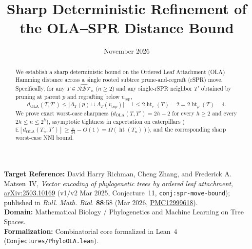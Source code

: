 \documentclass[11pt]{article}
\title{Sharp Deterministic Refinement of the OLA--SPR Distance Bound}
\author{}
\date{November 2026}
\theoremstyle{definition}
\theoremstyle{remark}
\DeclareMathOperator{\htr}{ht}
\begin{document}
\maketitle

\begin{center}
\small
\textbf{Target Reference:} David Harry Richman, Cheng Zhang, and Frederick A. Matsen~IV,
\emph{Vector encoding of phylogenetic trees by ordered leaf attachment},
\href{https://arxiv.org/abs/2503.10169}{arXiv:2503.10169} (v1/v2 Mar 2025, Conjecture~11, \texttt{conj:spr-move-bound});
published in \emph{Bull. Math. Biol.} \textbf{88}:58 (Mar 2026,
\href{https://pmc.ncbi.nlm.nih.gov/articles/PMC12999618/}{PMC12999618}).\\[3pt]
\textbf{Domain:} Mathematical Biology / Phylogenetics and Machine Learning on Tree Spaces.\\[3pt]
\textbf{Formalization:} Combinatorial core formalized in Lean~4 (\texttt{Conjectures/PhyloOLA.lean}).
\end{center}

\medskip

\begin{abstract}
We establish a sharp deterministic bound on the Ordered Leaf Attachment (OLA) Hamming distance across a single rooted subtree prune-and-regraft (rSPR) move. Specifically, for any $T \in \widehat{\mathcal{RBT}}_n$ ($n \ge 2$) and any single-rSPR neighbor $T'$ obtained by pruning at parent $p$ and regrafting below $v_{\mathrm{top}}$,
\[
  d_{\mathrm{OLA}}(T, T') \le \bigl|A_T(p) \cup A_T(v_{\mathrm{top}})\bigr| - 1 \le 2\htr_r(T) - 2 = 2\htr_\rho(T) - 4.
\]
We prove exact worst-case sharpness ($d_{\mathrm{OLA}}(T, T') = 2h - 2$ for every $h \ge 2$ and every $2h \le n \le 2^h$), asymptotic tightness in expectation on caterpillars ($\mathbb{E}[d_{\mathrm{OLA}}(T_n, T')] \ge \frac{n}{24} - O(1) = \Omega(\htr(T_n))$), and the corresponding sharp worst-case NNI bound.
\end{abstract}
\end{document}
